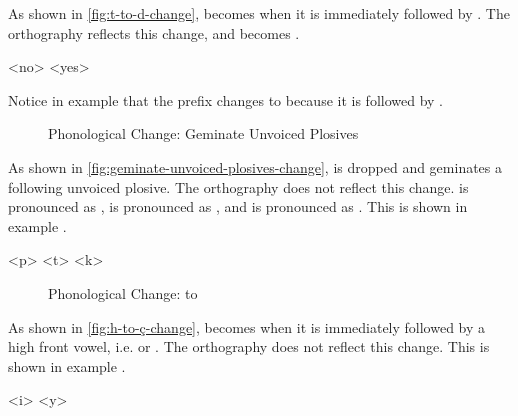 As shown in \autoref{fig:t-to-d-change},  becomes  when it is immediately followed by . The orthography reflects this change, and  becomes .

	\a<no>    
	\a<yes>    
\xe

Notice in example  that the prefix  changes to  because it is followed by .

\begin{figure}[h]\centering
	\caption{Phonological Change: Geminate Unvoiced Plosives}
	\label{fig:geminate-unvoiced-plosives-change}
\end{figure}

As shown in \autoref{fig:geminate-unvoiced-plosives-change},  is dropped and geminates a following unvoiced plosive. The orthography does not reflect this change.  is pronounced as ,  is pronounced as , and  is pronounced as . This is shown in example .

\pex[exno=\getref{assimd}]
	    
	    
	    
\xe

\begin{figure}[h]\centering
	\caption{Phonological Change:  to }
	\label{fig:h-to-ç-change}
\end{figure}

As shown in \autoref{fig:h-to-ç-change},  becomes  when it is immediately followed by a high front vowel, i.e.  or . The orthography does not reflect this change. This is shown in example .

\pex[exno=\getref{palatalh}]
	    
	    
\xe

